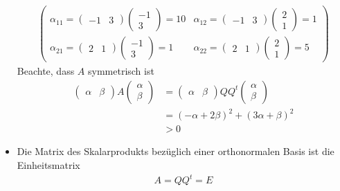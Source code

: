 \begin{itemize}
\begin{align}
\begin{pmatrix} \alpha_{11} = \begin{pmatrix} -1 & 3\end{pmatrix} \begin{pmatrix} -1 \\ 3 \end{pmatrix} = 10 & \alpha_{12} = \begin{pmatrix} -1 & 3\end{pmatrix} \begin{pmatrix} 2 \\ 1 \end{pmatrix} = 1 \\ \alpha_{21} = \begin{pmatrix} 2 & 1 \end{pmatrix} \begin{pmatrix} -1 \\ 3 \end{pmatrix} = 1 & \alpha_{22} = \begin{pmatrix} 2 & 1 \end{pmatrix} \begin{pmatrix} 2 \\ 1 \end{pmatrix} = 5\end{pmatrix}
\end{align}
Beachte, dass $A$ symmetrisch ist
\begin{align}
\begin{pmatrix} \alpha & \beta \end{pmatrix} A \begin{pmatrix} \alpha \\ \beta \end{pmatrix} &= \begin{pmatrix} \alpha & \beta \end{pmatrix} Q Q^t \begin{pmatrix} \alpha \\ \beta \end{pmatrix} \\
&= (- \alpha + 2 \beta)^2 + (3\alpha + \beta)^2 \\
&> 0
\end{align}

\item Die Matrix des Skalarprodukts bezüglich einer orthonormalen Basis ist die Einheitsmatrix
\begin{align}
A = QQ^t = E
\end{align}
\end{itemize}

